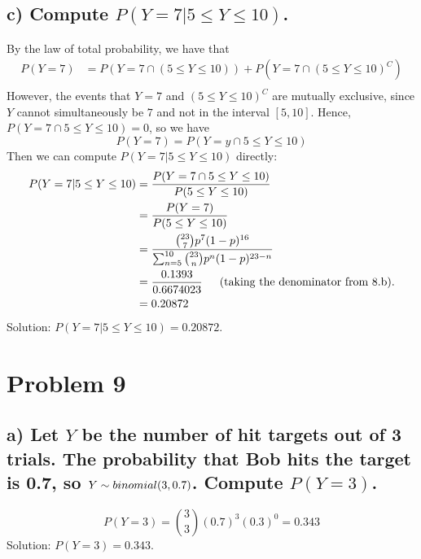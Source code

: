 \documentclass[11pt, letterpaper]{article}
\begin{document}
\subsection*{c) \normalfont Compute $P(Y=7|5\leq Y\leq 10)$.}
By the law of total probability, we have that
\begin{align*}
    P(Y=7)&=P(Y=7\cap (5\leq Y\leq 10))+P(Y=7\cap(5\leq Y\leq 10)^C)\\
\end{align*}
However, the events that $Y=7$ and $(5\leq Y\leq 10)^C$ are mutually exclusive, since $Y$ cannot simultaneously
be $7$ and not in the interval $[5,10]$. Hence, $P(Y=7\cap 5\leq Y\leq 10)=0$, so we have
\[P(Y=7)=P(Y=y\cap 5\leq Y\leq 10)\]
Then we can compute $P(Y=7|5\leq Y\leq 10)$ directly:
\begin{align*}
    P(Y=7|5\leq Y\leq 10)&=\frac{P(Y=7\cap 5\leq Y\leq 10)}{P(5\leq Y\leq 10)}\\
    &=\frac{P(Y=7)}{P(5\leq Y\leq 10)}\\
    &=\frac{{23\choose 7}p^7(1-p)^{16}}{\sum_{n=5}^{10}{23\choose n}p^n(1-p)^{23-n}}\\
    &=\frac{0.1393}{0.6674023} \text{\indent (taking the denominator from 8.b).}\\
    &=0.20872
\end{align*}
Solution: $P(Y=7|5\leq Y\leq 10)=0.20872$.

\section*{Problem 9}
\subsection*{a) \normalfont Let $Y$ be the number of hit targets out of 3 trials. The probability that Bob 
hits the target is 0.7, so $Y\sim binomial(3,\space 0.7)$. Compute $P(Y=3)$.}
\[P(Y=3)={3\choose 3}(0.7)^3(0.3)^0=0.343\]
Solution: $P(Y=3)=0.343$.
\end{document}
